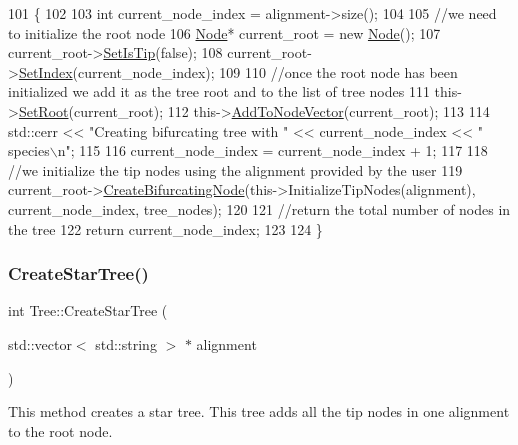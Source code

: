 \begin{DoxyCode}
101                                                               \{
102   
103   \textcolor{keywordtype}{int} current\_node\_index = alignment->size();
104   
105   \textcolor{comment}{//we need to initialize the root node}
106   \hyperlink{classNode}{Node}* current\_root = \textcolor{keyword}{new} \hyperlink{classNode}{Node}();
107   current\_root->\hyperlink{classNode_a89bff92e3930d521439395ccf332418f}{SetIsTip}(\textcolor{keyword}{false});
108   current\_root->\hyperlink{classNode_a6f2acc7b954108a6fe266838fce50ef6}{SetIndex}(current\_node\_index);
109   
110   \textcolor{comment}{//once the root node has been initialized we add it as the tree root and to the list of tree nodes}
111   this->\hyperlink{classTree_ae592faa2c1f2da3cc1157bd9a4b884b5}{SetRoot}(current\_root);
112   this->\hyperlink{classTree_aba172068387b9b5be1a6750a30e8199a}{AddToNodeVector}(current\_root);
113   
114   std::cerr << \textcolor{stringliteral}{"Creating bifurcating tree with "} << current\_node\_index << \textcolor{stringliteral}{" species\(\backslash\)n"};
115 
116   current\_node\_index = current\_node\_index + 1;
117   
118   \textcolor{comment}{//we initialize the tip nodes using the alignment provided by the user}
119   current\_root->\hyperlink{classNode_aed21bd99e0d680ea7c6a1524e989b9d4}{CreateBifurcatingNode}(this->InitializeTipNodes(alignment), 
      current\_node\_index, tree\_nodes);
120   
121   \textcolor{comment}{//return the total number of nodes in the tree}
122   \textcolor{keywordflow}{return} current\_node\_index;
123   
124 \}
\end{DoxyCode}
\mbox{\label{classTree_a489e5392997aebd8ae98c97fb4fdb0a0}} 
\subsubsection{\texorpdfstring{Create\+Star\+Tree()}{CreateStarTree()}}
{\footnotesize\ttfamily int Tree\+::\+Create\+Star\+Tree (\begin{DoxyParamCaption}\item[{std\+::vector$<$ std\+::string $>$ $\ast$}]{alignment }\end{DoxyParamCaption})}

This method creates a star tree. This tree adds all the tip nodes in one alignment to the root node.



